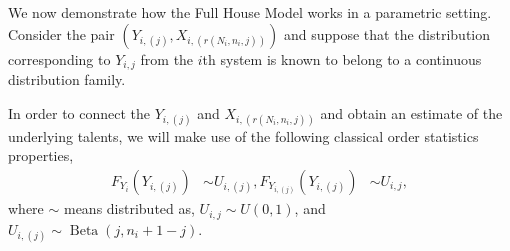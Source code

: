 \documentclass[12pt]{article}
\begin{document}
\bigskip
We now demonstrate how the Full House Model works in a parametric setting. Consider the pair 
$(Y_{i,(j)}, X_{i,(r(N_i, n_i, j))})$ 
and suppose that the distribution corresponding to $Y_{i, j}$ from the $i$th system is known to belong to a continuous distribution family.  %

In order to connect the  $Y_{i,(j)}$ and $X_{i,(r(N_i, n_i, j))}$ and obtain an estimate of the underlying talents,  we will make use of the following classical order statistics properties, 
$$
\begin{aligned}
F_{Y_i}\left(Y_{i,(j)} \right) & \sim U_{i,(j)}, %
F_{Y_{i,(j)}}\left(Y_{i,(j)} \right) & \sim U_{i,j}, %
\end{aligned}
$$
where %
$\sim$ means distributed as, $U_{i,j} \sim U(0,1)$, and $U_{i,(j)} \sim \operatorname{Beta}(j, n_i+1-j)$. %
\end{document}
